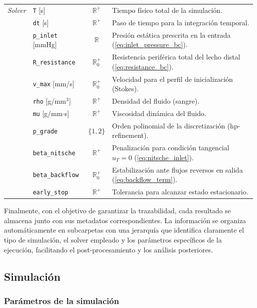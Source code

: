 \documentclass[12pt, letterpaper]{article}
\begin{document}
\begin{table}[htbp]
\begin{tabularx}{\textwidth}{@{} l l c X @{}}
    \textit{Solver} & \texttt{T} [s] & $\mathbb{R}^{+}$ & Tiempo físico total de la simulación. \\
    & \texttt{dt} [s] & $\mathbb{R}^{+}$ & Paso de tiempo para la integración temporal. \\
    & \texttt{p\_inlet} [mmHg] & $\mathbb{R}$ & Presión estática prescrita en la entrada (\cref{eq:inlet_pressure_bc}). \\
    & \texttt{R\_resistance} & $\mathbb{R}_{0}^{+}$ & Resistencia periférica total del lecho distal (\cref{eq:resistance_bc}). \\
    & \texttt{v\_max} [mm/s] & $\mathbb{R}_{0}^{+}$ & Velocidad para el perfil de inicialización (Stokes). \\
    & \texttt{rho} [g/mm$^3$] & $\mathbb{R}^{+}$ & Densidad del fluido (sangre). \\
    & \texttt{mu} [g/mm$\cdot$s] & $\mathbb{R}^{+}$ & Viscosidad dinámica del fluido. \\
    & \texttt{p\_grade} & $\{1, 2\}$ & Orden polinomial de la discretización (hp-refinement). \\
    & \texttt{beta\_nitsche} & $\mathbb{R}^{+}$ & Penalización para condición tangencial $u_T = 0$ (\cref{eq:nitsche_inlet}). \\
    & \texttt{beta\_backflow} & $\mathbb{R}_{0}^{+}$ & Estabilización ante flujos reversos en salida (\cref{eq:backflow_term}). \\
    & \texttt{early\_stop} & $\mathbb{R}^{+}$ & Tolerancia para alcanzar estado estacionario. \\
    \bottomrule
  \end{tabularx}
\end{table}


Finalmente, con el objetivo de garantizar la trazabilidad, cada resultado se almacena junto con sus metadatos correspondientes. La información se organiza automáticamente en subcarpetas con una jerarquía que identifica claramente el tipo de simulación, el solver empleado y los parámetros específicos de la ejecución, facilitando el post-procesamiento y los análisis posteriores.

\subsection{Simulación}

\subsubsection{Parámetros de la simulación} \label{sec:param_lad}
\end{document}
